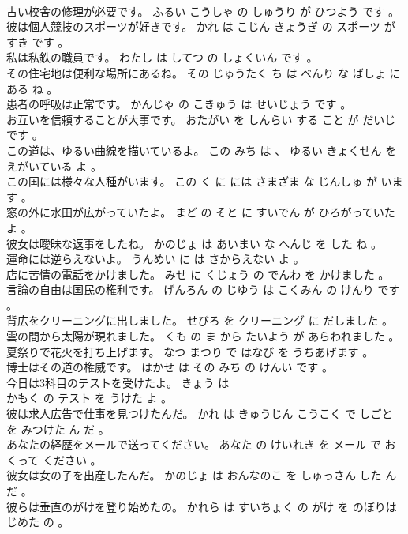 \documentclass[8pt]{extreport}
\begin{document}
\begin{CJK}{UTF8}{min}
\\	古い校舎の修理が必要です。	ふるい こうしゃ の しゅうり が ひつよう です 。 
\\	彼は個人競技のスポーツが好きです。	かれ は こじん きょうぎ の スポーツ が すき です 。 
\\	私は私鉄の職員です。	わたし は してつ の しょくいん です 。 
\\	その住宅地は便利な場所にあるね。	その じゅうたく ち は べんり な ばしょ に ある ね 。 
\\	患者の呼吸は正常です。	かんじゃ の こきゅう は せいじょう です 。 
\\	お互いを信頼することが大事です。	おたがい を しんらい する こと が だいじ です 。 
\\	この道は、ゆるい曲線を描いているよ。	この みち は 、 ゆるい きょくせん を えがいている よ 。 
\\	この国には様々な人種がいます。	この く に には さまざま な じんしゅ が います 。 
\\	窓の外に水田が広がっていたよ。	まど の そと に すいでん が ひろがっていた よ 。 
\\	彼女は曖昧な返事をしたね。	かのじょ は あいまい な へんじ を した ね 。 
\\	運命には逆らえないよ。	うんめい に は さからえない よ 。 
\\	店に苦情の電話をかけました。	みせ に くじょう の でんわ を かけました 。 
\\	言論の自由は国民の権利です。	げんろん の じゆう は こくみん の けんり です 。 
\\	背広をクリーニングに出しました。	せびろ を クリーニング に だしました 。 
\\	雲の間から太陽が現れました。	くも の ま から たいよう が あらわれました 。 
\\	夏祭りで花火を打ち上げます。	なつ まつり で はなび を うちあげます 。 
\\	博士はその道の権威です。	はかせ は その みち の けんい です 。 
\\	今日は3科目のテストを受けたよ。	きょう は 
\\	かもく の テスト を うけた よ 。 
\\	彼は求人広告で仕事を見つけたんだ。	かれ は きゅうじん こうこく で しごと を みつけた ん だ 。 
\\	あなたの経歴をメールで送ってください。	あなた の けいれき を メール で おくって ください 。 
\\	彼女は女の子を出産したんだ。	かのじょ は おんなのこ を しゅっさん した ん だ 。 
\\	彼らは垂直のがけを登り始めたの。	かれら は すいちょく の がけ を のぼりはじめた の 。 

\end{CJK}
\end{document}
